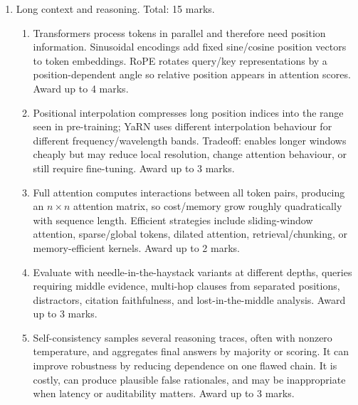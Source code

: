 \documentclass[11pt,a4paper]{article}
\begin{document}
\begin{enumerate}[leftmargin=*]
\item Long context and reasoning. Total: 15 marks.
\begin{enumerate}
\item Transformers process tokens in parallel and therefore need position information. Sinusoidal encodings add fixed sine/cosine position vectors to token embeddings. RoPE rotates query/key representations by a position-dependent angle so relative position appears in attention scores. Award up to 4 marks.
\item Positional interpolation compresses long position indices into the range seen in pre-training; YaRN uses different interpolation behaviour for different frequency/wavelength bands. Tradeoff: enables longer windows cheaply but may reduce local resolution, change attention behaviour, or still require fine-tuning. Award up to 3 marks.
\item Full attention computes interactions between all token pairs, producing an \(n \times n\) attention matrix, so cost/memory grow roughly quadratically with sequence length. Efficient strategies include sliding-window attention, sparse/global tokens, dilated attention, retrieval/chunking, or memory-efficient kernels. Award up to 2 marks.
\item Evaluate with needle-in-the-haystack variants at different depths, queries requiring middle evidence, multi-hop clauses from separated positions, distractors, citation faithfulness, and lost-in-the-middle analysis. Award up to 3 marks.
\item Self-consistency samples several reasoning traces, often with nonzero temperature, and aggregates final answers by majority or scoring. It can improve robustness by reducing dependence on one flawed chain. It is costly, can produce plausible false rationales, and may be inappropriate when latency or auditability matters. Award up to 3 marks.
\end{enumerate}


\end{enumerate}
\end{document}
